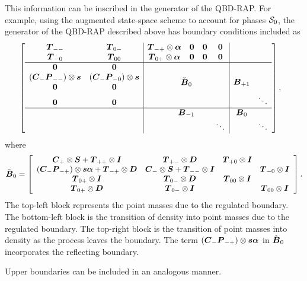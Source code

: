 This information can be inscribed in the generator of the QBD-RAP. For example, using the augmented state-space scheme to account for phases \(\mathcal{S}_0\), the generator of the QBD-RAP described above has boundary conditions included as 
\begin{align*}
&\left[\begin{array}{cc|cccc|cc}
	\bs T_{--} & \bs T_{0-} & \bs T_{-+} \otimes\bs \alpha & \bs 0 & \bs 0 & \bs 0 &&\\
	\bs T_{-0} & \bs T_{00} & \bs T_{0+} \otimes\bs \alpha & \bs 0 & \bs 0 & \bs 0 &&\\\hline
	\bs 0 & \bs 0 &\multicolumn{4}{c|}{\multirow{4}{*}{$\check{\bs B}_{0}$}} & \multirow{4}{*}{$\bs B_{+1}$}& \\
	(\bs C_-\bs P_{--})\otimes \bs s &(\bs C_-\bs P_{-0}) \otimes \bs s& \multicolumn{4}{c|}{} & &\\
	\bs 0 & \bs 0 & \multicolumn{4}{c|}{} &&\\
	\bs 0 & \bs 0 & \multicolumn{4}{c|}{} && \ddots\\ \hline
	& & \multicolumn{4}{c|}{\bs B_{-1}} & \bs B_0 &\\
	& & \multicolumn{3}{c}{}& \ddots &  & \ddots
	\end{array}\right],
\end{align*}
where 
\[\check{\boldsymbol B}_{0} = \left[\begin{array}{cccc}
	 \boldsymbol{C}_+\otimes \boldsymbol{S} + \boldsymbol{T}_{++}\otimes \boldsymbol{I} & \boldsymbol{T}_{+-}\otimes \boldsymbol{D} & \boldsymbol{T}_{+0}\otimes \boldsymbol{I} &  \\
	 (\boldsymbol C_-\boldsymbol P_{-+})\otimes \boldsymbol s \boldsymbol \alpha + \boldsymbol T_{-+}\otimes \boldsymbol D  & \boldsymbol{C}_-\otimes \boldsymbol{S} + \boldsymbol{T}_{--}\otimes \boldsymbol{I} &  & \boldsymbol{T}_{-0}\otimes \boldsymbol{I} \\
	 \boldsymbol{T}_{0+}\otimes \boldsymbol{I} & \boldsymbol{T}_{0-}\otimes \boldsymbol{D} & \boldsymbol{T}_{00}\otimes \boldsymbol{I} &  \\
	 \boldsymbol{T}_{0+}\otimes \boldsymbol{D} & \boldsymbol{T}_{0-}\otimes \boldsymbol{I} &  & \boldsymbol{T}_{00}\otimes \boldsymbol{I} 
	\end{array}\right].\]
The top-left block represents the point masses due to the regulated boundary. The bottom-left block is the transition of density into point masses due to the regulated boundary. The top-right block is the transition of point masses into density as the process leaves the boundary. The term \((\boldsymbol C_-\boldsymbol P_{-+})\otimes \boldsymbol s \boldsymbol \alpha\) in \(\check{\boldsymbol B}_{0}\) incorporates the reflecting boundary.

Upper boundaries can be included in an analogous manner. 

